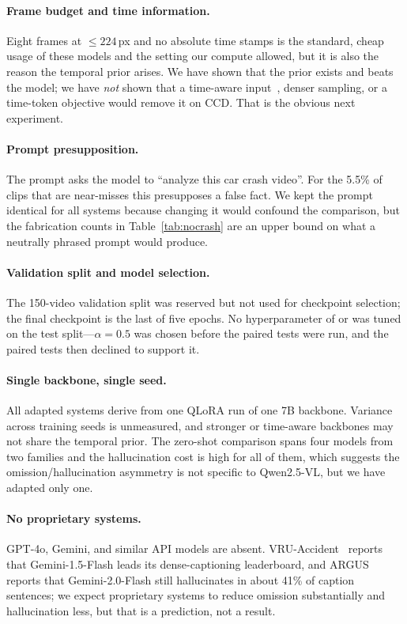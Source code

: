 \paragraph{Frame budget and time information.}
Eight frames at $\leq224$\,px and no absolute time stamps is the standard, cheap usage of these models and the setting our compute allowed, but it is also the reason the temporal prior arises.
We have shown that the prior exists and beats the model; we have \emph{not} shown that a time-aware input~\cite{timechat,vtimellm,lita}, denser sampling, or a time-token objective would remove it on CCD.
That is the obvious next experiment.

\paragraph{Prompt presupposition.}
The prompt asks the model to ``analyze this car crash video''.
For the 5.5\% of clips that are near-misses this presupposes a false fact.
We kept the prompt identical for all systems because changing it would confound the comparison, but the fabrication counts in Table~\ref{tab:nocrash} are an upper bound on what a neutrally phrased prompt would produce.

\paragraph{Validation split and model selection.}
The 150-video validation split was reserved but not used for checkpoint selection; the final checkpoint is the last of five epochs.
No hyperparameter of \crashlogic{} or \tcd{} was tuned on the test split---$\alpha{=}0.5$ was chosen before the paired tests were run, and the paired tests then declined to support it.

\paragraph{Single backbone, single seed.}
All adapted systems derive from one QLoRA run of one 7B backbone.
Variance across training seeds is unmeasured, and stronger or time-aware backbones may not share the temporal prior.
The zero-shot comparison spans four models from two families and the hallucination cost is high for all of them, which suggests the omission/hallucination asymmetry is not specific to Qwen2.5-VL, but we have adapted only one.

\paragraph{No proprietary systems.}
GPT-4o, Gemini, and similar API models are absent.
VRU-Accident~\cite{vruaccident} reports that Gemini-1.5-Flash leads its dense-captioning leaderboard, and ARGUS~\cite{argus2025} reports that Gemini-2.0-Flash still hallucinates in about 41\% of caption sentences; we expect proprietary systems to reduce omission substantially and hallucination less, but that is a prediction, not a result.

